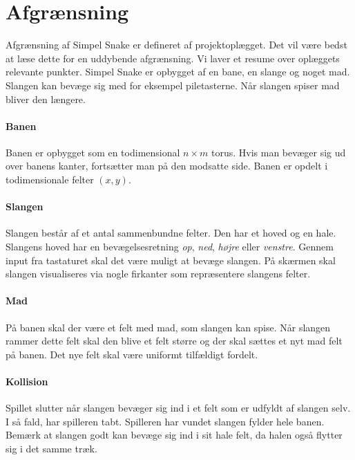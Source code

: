 \section{Afgrænsning}
Afgrænsning af Simpel Snake er defineret af projektoplægget. Det vil være bedst at læse dette for en uddybende afgrænsning. Vi laver et resume over oplæggets relevante punkter. Simpel Snake er opbygget af en bane, en slange og noget mad. Slangen kan bevæge sig med for eksempel piletasterne. Når slangen spiser mad bliver den længere.

\paragraph{Banen}
Banen er opbygget som en todimensional $n\times m$ torus. Hvis man bevæger sig ud over banens kanter, fortsætter man på den modsatte side. Banen er opdelt i todimensionale felter $(x,y)$. 

\paragraph{Slangen}
Slangen består af et antal sammenbundne felter. Den har et hoved og en hale. Slangens hoved har en bevægelsesretning \textit{op}, \textit{ned}, \textit{højre} eller \textit{venstre}. Gennem input fra tastaturet skal det være muligt at bevæge slangen. På skærmen skal slangen visualiseres via nogle firkanter som repræsentere slangens felter.

\paragraph{Mad}
På banen skal der være et felt med mad, som slangen kan spise. Når slangen rammer dette felt skal den blive et felt større og der skal sættes et nyt mad felt på banen. Det nye felt skal være uniformt tilfældigt fordelt.

\paragraph{Kollision}
Spillet slutter når slangen bevæger sig ind i et felt som er udfyldt af slangen selv. I så fald, har spilleren tabt. Spilleren har vundet slangen fylder hele banen. Bemærk at slangen godt kan bevæge sig ind i sit hale felt, da halen også flytter sig i det samme træk.